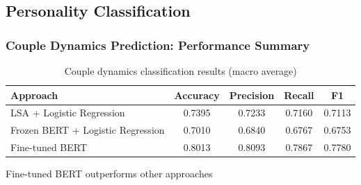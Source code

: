 \documentclass[aspectratio=169,xcolor=dvipsnames]{beamer}
\begin{document}
\subsection{Personality Classification}

\begin{frame}
\frametitle{Couple Dynamics Prediction: Performance Summary}

\begin{table}
\centering
\begin{tabular}{lcccc}
\toprule
\textbf{Approach} & \textbf{Accuracy} & \textbf{Precision} & \textbf{Recall} & \textbf{F1} \\
\midrule
LSA + Logistic Regression & 0.7395 & 0.7233 & 0.7160 & 0.7113 \\
Frozen BERT + Logistic Regression & 0.7010 & 0.6840 & 0.6767 & 0.6753 \\
Fine-tuned BERT & 0.8013 & 0.8093 & 0.7867 & 0.7780 \\
\bottomrule
\end{tabular}
\caption{Couple dynamics classification results (macro average)}
\end{table}

\vspace{0.2cm}
\begin{center}
\colorbox{blue!10}{\parbox{0.75\linewidth}{\centering Fine-tuned BERT outperforms other approaches}}
\end{center}

\end{frame}
\end{document}
